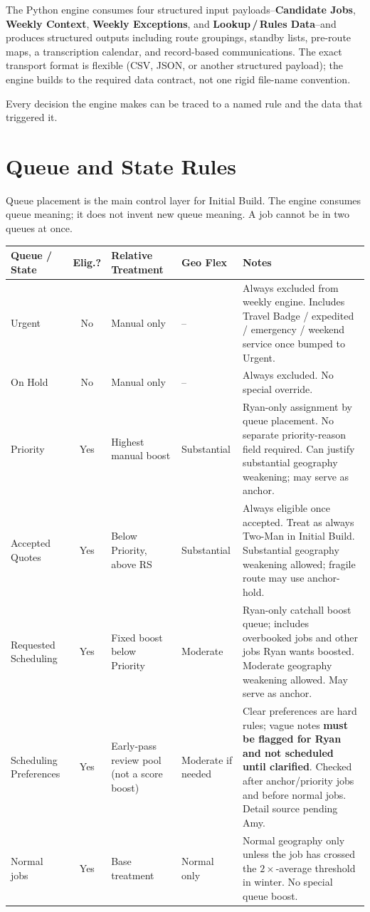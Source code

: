 \documentclass[12pt]{article}
\begin{document}
The Python engine consumes four structured input payloads--\textbf{Candidate Jobs}, \textbf{Weekly Context}, \textbf{Weekly Exceptions}, and \textbf{Lookup\,/\,Rules Data}--and produces structured outputs including route groupings, standby lists, pre-route maps, a transcription calendar, and record-based communications.
The exact transport format is flexible (CSV, JSON, or another structured payload); the engine builds to the required data contract, not one rigid file-name convention.

Every decision the engine makes can be traced to a named rule and the data that triggered it.

\section*{Queue and State Rules}
\label{sec:queues}

Queue placement is the main control layer for Initial Build.
The engine consumes queue meaning; it does not invent new queue meaning.
A job cannot be in two queues at once.

\medskip
{\scriptsize
\begin{longtable}{p{2.2cm}cp{2.5cm}p{1.5cm}p{6.5cm}}
\toprule
\textbf{Queue / State} & \textbf{Elig.?} & \textbf{Relative Treatment} & \textbf{Geo Flex} & \textbf{Notes} \\
\midrule
Urgent          & No  & Manual only             & --          & Always excluded from weekly engine.  Includes Travel Badge / expedited / emergency / weekend service once bumped to Urgent. \\
On Hold         & No  & Manual only             & --          & Always excluded.  No special override. \\
Priority        & Yes & Highest manual boost    & Substantial  & Ryan-only assignment by queue placement.  No separate priority-reason field required.  Can justify substantial geography weakening; may serve as anchor. \\
Accepted Quotes & Yes & Below Priority, above RS & Substantial  & Always eligible once accepted.  Treat as always Two-Man in Initial Build.  Substantial geography weakening allowed; fragile route may use anchor-hold. \\
Requested Scheduling & Yes & Fixed boost below Priority & Moderate & Ryan-only catchall boost queue; includes overbooked jobs and other jobs Ryan wants boosted.  Moderate geography weakening allowed.  May serve as anchor. \\
Scheduling Preferences & Yes & Early-pass review pool (not a score boost) & Moderate if needed & Clear preferences are hard rules; vague notes \textbf{must be flagged for Ryan and not scheduled until clarified}.  Checked after anchor/priority jobs and before normal jobs.  Detail source pending Amy. \\
Normal jobs     & Yes & Base treatment           & Normal only  & Normal geography only unless the job has crossed the $2\times$-average threshold in winter.  No special queue boost. \\
\bottomrule
\end{longtable}
}
\end{document}
